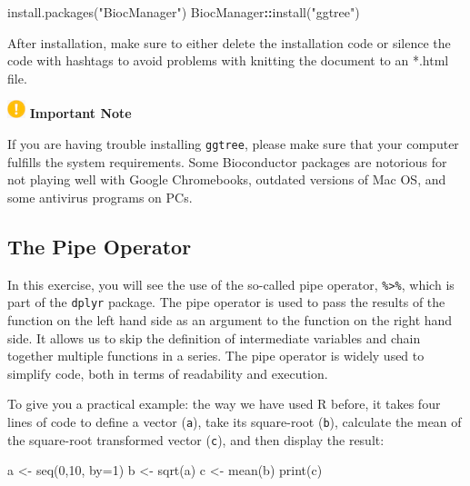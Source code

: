 \documentclass[
]{book}
\newenvironment{Shaded}{\begin{snugshade}}{\end{snugshade}}
\newcommand{\AttributeTok}[1]{\textcolor[rgb]{0.77,0.63,0.00}{#1}}
\newcommand{\DataTypeTok}[1]{\textcolor[rgb]{0.13,0.29,0.53}{#1}}
\newcommand{\DecValTok}[1]{\textcolor[rgb]{0.00,0.00,0.81}{#1}}
\newcommand{\FunctionTok}[1]{\textcolor[rgb]{0.00,0.00,0.00}{#1}}
\newcommand{\KeywordTok}[1]{\textcolor[rgb]{0.13,0.29,0.53}{\textbf{#1}}}
\newcommand{\NormalTok}[1]{#1}
\newcommand{\OtherTok}[1]{\textcolor[rgb]{0.56,0.35,0.01}{#1}}
\newcommand{\StringTok}[1]{\textcolor[rgb]{0.31,0.60,0.02}{#1}}
\begin{document}
\begin{Shaded}
\begin{Highlighting}[]
\NormalTok{install}\AttributeTok{.packages}\NormalTok{(}\StringTok{"BiocManager"}\NormalTok{)}
\DataTypeTok{BiocManager}\KeywordTok{::}\AttributeTok{install}\NormalTok{(}\StringTok{"ggtree"}\NormalTok{)}
\end{Highlighting}
\end{Shaded}

After installation, make sure to either delete the installation code or silence the code with hashtags to avoid problems with knitting the document to an *.html file.

\includegraphics[width=0.20833in,height=\textheight]{images/important.png} \textbf{Important Note}

If you are having trouble installing \texttt{ggtree}, please make sure that your computer fulfills the system requirements. Some Bioconductor packages are notorious for not playing well with Google Chromebooks, outdated versions of Mac OS, and some antivirus programs on PCs.

\hypertarget{the-pipe-operator}{%
\subsection{The Pipe Operator}\label{the-pipe-operator}}

In this exercise, you will see the use of the so-called pipe operator, \texttt{\%\textgreater{}\%}, which is part of the \texttt{dplyr} package. The pipe operator is used to pass the results of the function on the left hand side as an argument to the function on the right hand side. It allows us to skip the definition of intermediate variables and chain together multiple functions in a series. The pipe operator is widely used to simplify code, both in terms of readability and execution.

To give you a practical example: the way we have used R before, it takes four lines of code to define a vector (\texttt{a}), take its square-root (\texttt{b}), calculate the mean of the square-root transformed vector (\texttt{c}), and then display the result:

\begin{Shaded}
\begin{Highlighting}[]
\NormalTok{a }\OtherTok{\textless{}{-}} \FunctionTok{seq}\NormalTok{(}\DecValTok{0}\NormalTok{,}\DecValTok{10}\NormalTok{, }\AttributeTok{by=}\DecValTok{1}\NormalTok{)}
\NormalTok{b }\OtherTok{\textless{}{-}} \FunctionTok{sqrt}\NormalTok{(a)}
\NormalTok{c }\OtherTok{\textless{}{-}} \FunctionTok{mean}\NormalTok{(b)}
\FunctionTok{print}\NormalTok{(c)}
\end{Highlighting}
\end{Shaded}
\end{document}
